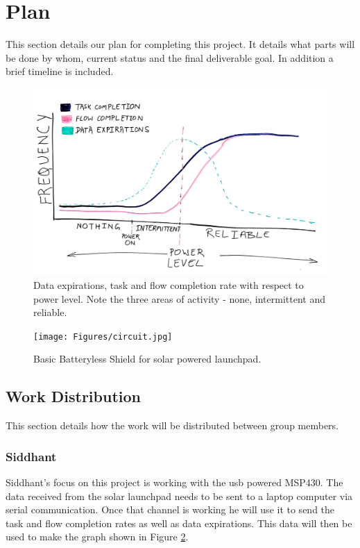 \section{Plan} %
\label{sec:plan}

This section details our plan for completing this project.
It details what parts will be done by whom, current status and the final deliverable goal.
In addition a brief timeline is included.

\begin{figure}[!ht] %
\centering
\includegraphics[width=1.0\linewidth]{Figures/graph.jpeg}
\caption{
 Data expirations, task and flow completion rate with respect to power level.
 Note the three areas of activity - none, intermittent and reliable.
}
\label{f:circuit}
\end{figure}

\begin{figure}[!ht] %
\centering
\texttt{[image: Figures/circuit.jpg]}
\caption{
Basic Batteryless Shield for solar powered launchpad.
}
\label{f:graph}
\end{figure}

\subsection{Work Distribution}

This section details how the work will be distributed between group members.

\subsubsection{Siddhant}
Siddhant's focus on this project is working with the usb powered MSP430.
The data received from the solar launchpad needs to be sent to a laptop computer via serial communication.
Once that channel is working he will use it to send the task and flow completion rates as well as data expirations.
This data will then be used to make the graph shown in Figure \ref{f:graph}.

